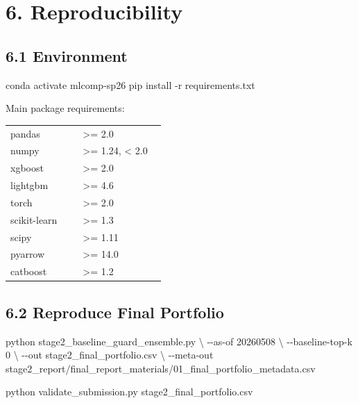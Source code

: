 \documentclass[11pt]{article}
\newenvironment{Shaded}{}{}
\newcommand{\AttributeTok}[1]{\textcolor[rgb]{0.49,0.56,0.16}{#1}}
\newcommand{\DataTypeTok}[1]{\textcolor[rgb]{0.56,0.13,0.00}{#1}}
\newcommand{\ExtensionTok}[1]{#1}
\newcommand{\NormalTok}[1]{#1}
\begin{document}
\section{6. Reproducibility}\label{reproducibility}

\subsection{6.1 Environment}\label{environment}

\begin{Shaded}
\begin{Highlighting}[]
\ExtensionTok{conda}\NormalTok{ activate mlcomp{-}sp26}
\ExtensionTok{pip}\NormalTok{ install }\AttributeTok{{-}r}\NormalTok{ requirements.txt}
\end{Highlighting}
\end{Shaded}

Main package requirements:

\begin{longtable}[]{@{}|>{\RaggedRight\arraybackslash}m{0.42\linewidth}|>{\Centering\arraybackslash}m{0.48\linewidth}|@{}}
\hline\rowcolor{tableHead}
\multicolumn{1}{|c|}{\textbf{Package}} & \multicolumn{1}{c|}{\textbf{Requirement}} \\
\hline
\endhead
\hline
\endlastfoot
pandas & \textgreater= 2.0 \\
\hline
numpy & \textgreater= 1.24, \textless{} 2.0 \\
\hline
xgboost & \textgreater= 2.0 \\
\hline
lightgbm & \textgreater= 4.6 \\
\hline
torch & \textgreater= 2.0 \\
\hline
scikit-learn & \textgreater= 1.3 \\
\hline
scipy & \textgreater= 1.11 \\
\hline
pyarrow & \textgreater= 14.0 \\
\hline
catboost & \textgreater= 1.2 \\
\end{longtable}

\subsection{6.2 Reproduce Final
Portfolio}\label{reproduce-final-portfolio}

\begin{Shaded}
\begin{Highlighting}[]
\ExtensionTok{python}\NormalTok{ stage2\_baseline\_guard\_ensemble.py }\DataTypeTok{\textbackslash{}}
  \AttributeTok{{-}{-}as{-}of}\NormalTok{ 20260508 }\DataTypeTok{\textbackslash{}}
  \AttributeTok{{-}{-}baseline{-}top{-}k}\NormalTok{ 0 }\DataTypeTok{\textbackslash{}}
  \AttributeTok{{-}{-}out}\NormalTok{ stage2\_final\_portfolio.csv }\DataTypeTok{\textbackslash{}}
  \AttributeTok{{-}{-}meta{-}out}\NormalTok{ stage2\_report/final\_report\_materials/01\_final\_portfolio\_metadata.csv}

\ExtensionTok{python}\NormalTok{ validate\_submission.py stage2\_final\_portfolio.csv}
\end{Highlighting}
\end{Shaded}
\end{document}
